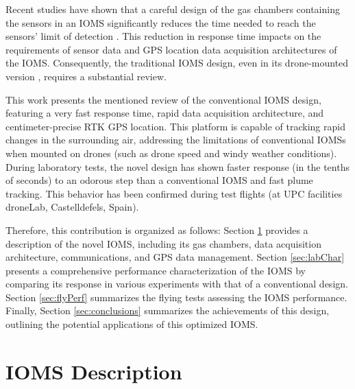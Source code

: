 \documentclass[lettersize,journal]{IEEEtran}
\begin{document}
Recent studies have shown that a careful design of the gas chambers containing the sensors in an IOMS significantly reduces the time needed to reach the sensors' limit of detection \cite{valdesueiro24dronE}. This reduction in response time impacts on the requirements of sensor data and GPS location data acquisition architectures of the IOMS. Consequently, the traditional IOMS design, even in its drone-mounted version \cite{burgues2021rhinos}, requires a substantial review.

This work presents the mentioned review of the conventional IOMS design, featuring a very fast response time, rapid data acquisition architecture, and centimeter-precise RTK GPS location. This platform is capable of tracking rapid changes in the surrounding air, addressing the limitations of conventional IOMSs when mounted on drones (such as drone speed and windy weather conditions). During laboratory tests, the novel design has shown faster response (in the tenths of seconds) to an odorous step than a conventional IOMS and fast plume tracking. This behavior has been confirmed during test flights (at UPC facilities droneLab, Castelldefels, Spain). 

Therefore, this contribution is organized as follows: Section \ref{sec:IOMS} provides a description of the novel IOMS, including its gas chambers, data acquisition architecture, communications, and GPS data management. Section \ref{sec:labChar} presents a comprehensive performance characterization of the IOMS by comparing its response in various experiments with that of a conventional design. Section \ref{sec:flyPerf} summarizes the flying tests assessing the IOMS performance. Finally, Section \ref{sec:conclusions} summarizes the achievements of this design, outlining the potential applications of this optimized IOMS.
\IEEEpubidadjcol
 
\section{IOMS Description}
\label{sec:IOMS}
\end{document}
